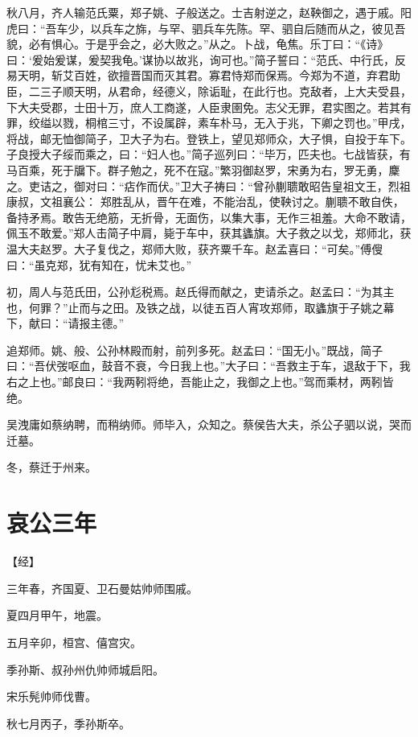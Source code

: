 \documentclass[a4paper,12pt,UTF8,twoside]{ctexbook}
\begin{document}
秋八月，齐人输范氏粟，郑子姚、子般送之。士吉射逆之，赵鞅御之，遇于戚。阳虎曰：“吾车少，以兵车之旆，与罕、驷兵车先陈。罕、驷自后随而从之，彼见吾貌，必有惧心。于是乎会之，必大败之。”从之。卜战，龟焦。乐丁曰：“《诗》曰：‘爰始爰谋，爰契我龟。’谋协以故兆，询可也。”简子誓曰：“范氏、中行氏，反易天明，斩艾百姓，欲擅晋国而灭其君。寡君恃郑而保焉。今郑为不道，弃君助臣，二三子顺天明，从君命，经德义，除诟耻，在此行也。克敌者，上大夫受县，下大夫受郡，士田十万，庶人工商遂，人臣隶圉免。志父无罪，君实图之。若其有罪，绞缢以戮，桐棺三寸，不设属辟，素车朴马，无入于兆，下卿之罚也。”甲戌，将战，邮无恤御简子，卫大子为右。登铁上，望见郑师众，大子惧，自投于车下。子良授大子绥而乘之，曰：“妇人也。”简子巡列曰：“毕万，匹夫也。七战皆获，有马百乘，死于牖下。群子勉之，死不在寇。”繁羽御赵罗，宋勇为右，罗无勇，麇之。吏诘之，御对曰：“痁作而伏。”卫大子祷曰：“曾孙蒯聩敢昭告皇祖文王，烈祖康叔，文祖襄公： 郑胜乱从，晋午在难，不能治乱，使鞅讨之。蒯聩不敢自佚，备持矛焉。敢告无绝筋，无折骨，无面伤，以集大事，无作三祖羞。大命不敢请，佩玉不敢爱。”郑人击简子中肩，毙于车中，获其蠭旗。大子救之以戈，郑师北，获温大夫赵罗。大子复伐之，郑师大败，获齐粟千车。赵孟喜曰：“可矣。”傅傁曰：“虽克郑，犹有知在，忧未艾也。”

初，周人与范氏田，公孙尨税焉。赵氏得而献之，吏请杀之。赵孟曰：“为其主也，何罪？”止而与之田。及铁之战，以徒五百人宵攻郑师，取蠭旗于子姚之幕下，献曰：“请报主德。”

追郑师。姚、般、公孙林殿而射，前列多死。赵孟曰：“国无小。”既战，简子曰：“吾伏弢呕血，鼓音不衰，今日我上也。”大子曰：“吾救主于车，退敌于下，我右之上也。”邮良曰：“我两靷将绝，吾能止之，我御之上也。”驾而乘材，两靷皆绝。

吴洩庸如蔡纳聘，而稍纳师。师毕入，众知之。蔡侯告大夫，杀公子驷以说，哭而迁墓。

冬，蔡迁于州来。



\chapter{哀公三年}



【经】

三年春，齐国夏、卫石曼姑帅师围戚。

夏四月甲午，地震。

五月辛卯，桓宫、僖宫灾。

季孙斯、叔孙州仇帅师城启阳。

宋乐髡帅师伐曹。

秋七月丙子，季孙斯卒。
\end{document}
